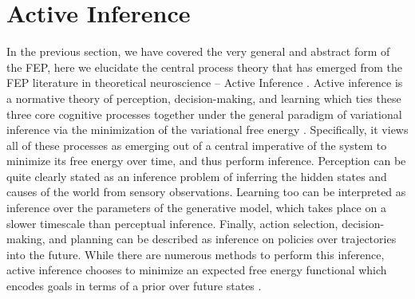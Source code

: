 \section{Active Inference}

In the previous section, we have covered the very general and abstract form of the FEP, here we elucidate the central process theory that has emerged from the FEP literature in theoretical neuroscience -- Active Inference \citep{friston2012active,friston2009reinforcement}. Active inference is a normative theory of perception, decision-making, and learning which ties these three core cognitive processes together under the general paradigm of variational inference via the minimization of the variational free energy \citep{friston2015active,friston2017process}. Specifically, it views all of these processes as emerging out of a central imperative of the system to minimize its free energy over time, and thus perform inference. Perception can be quite clearly stated as an inference problem of inferring the hidden states and causes of the world from sensory observations. Learning too can be interpreted as inference over the parameters of the generative model, which takes place on a slower timescale than perceptual inference. Finally, action selection, decision-making, and planning can be described as inference on policies over trajectories into the future. While there are numerous methods to perform this inference, active inference chooses to minimize an expected free energy functional which encodes goals in terms of a prior over future states \citep{da2020active}.

